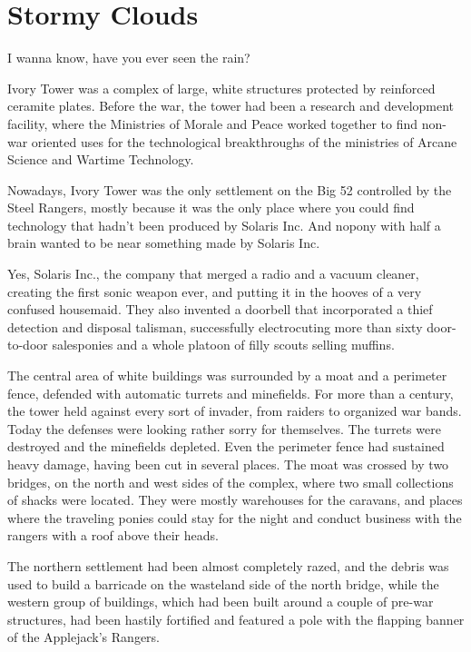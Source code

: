 
\chapter{Stormy Clouds}


\begin{intro}
I wanna know, have you ever seen the rain?
\end{intro}



Ivory Tower was a complex of large, white structures protected by reinforced ceramite plates. Before the war, the tower had been a research and development facility, where the Ministries of Morale and Peace worked together to find non-war oriented uses for the technological breakthroughs of the ministries of Arcane Science and Wartime Technology.

Nowadays, Ivory Tower was the only settlement on the Big 52 controlled by the Steel Rangers, mostly because it was the only place where you could find technology that hadn't been produced by Solaris Inc. And nopony with half a brain wanted to be near something made by Solaris Inc.

Yes, Solaris Inc., the company that merged a radio and a vacuum cleaner, creating the first sonic weapon ever, and putting it in the hooves of a very confused housemaid. They also invented a doorbell that incorporated a thief detection and disposal talisman, successfully electrocuting more than sixty door-to-door salesponies and a whole platoon of filly scouts selling muffins.

The central area of white buildings was surrounded by a moat and a perimeter fence, defended with automatic turrets and minefields. For more than a century, the tower held against every sort of invader, from raiders to organized war bands. Today the defenses were looking rather sorry for themselves. The turrets were destroyed and the minefields depleted. Even the perimeter fence had sustained heavy damage, having been cut in several places. The moat was crossed by two bridges, on the north and west sides of the complex, where two small collections of shacks were located. They were mostly warehouses for the caravans, and places where the traveling ponies could stay for the night and conduct business with the rangers with a roof above their heads.

The northern settlement had been almost completely razed, and the debris was used to build a barricade on the wasteland side of the north bridge, while the western group of buildings, which had been built around a couple of pre-war structures, had been hastily fortified and featured a pole with the flapping banner of the Applejack's Rangers.

